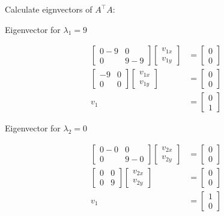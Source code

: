 \documentclass[11pt,letterpaper]{article}
\begin{document}
\begin{enumerate}
Calculate eignvectors of \( A^\top A \):

Eigenvector for \( \lambda_1 = 9 \)

\begin{align*}
    \begin{bmatrix}
        0-9 & 0 \\
        0 & 9-9
    \end{bmatrix}
    \begin{bmatrix}
        v_{1x} \\ v_{1y}
    \end{bmatrix}
    &= \begin{bmatrix}
        0 \\ 0
    \end{bmatrix} \\
    \begin{bmatrix}
        -9 & 0 \\
        0 & 0
    \end{bmatrix}
    \begin{bmatrix}
        v_{1x} \\ v_{1y}
    \end{bmatrix}
    &= \begin{bmatrix}
        0 \\ 0
    \end{bmatrix} \\
    v_1
    &= \begin{bmatrix}
        0 \\ 1
    \end{bmatrix}
\end{align*}

Eigenvector for \( \lambda_2 = 0 \)

\begin{align*}
    \begin{bmatrix}
        0-0 & 0 \\
        0 & 9-0
    \end{bmatrix}
    \begin{bmatrix}
        v_{2x} \\ v_{2y}
    \end{bmatrix}
    &= \begin{bmatrix}
        0 \\ 0
    \end{bmatrix} \\
    \begin{bmatrix}
        0 & 0 \\
        0 & 9
    \end{bmatrix}
    \begin{bmatrix}
        v_{2x} \\ v_{2y}
    \end{bmatrix}
    &= \begin{bmatrix}
        0 \\ 0
    \end{bmatrix} \\
    v_1
    &= \begin{bmatrix}
        1 \\ 0
    \end{bmatrix}
\end{align*}


\end{enumerate}
\end{document}
